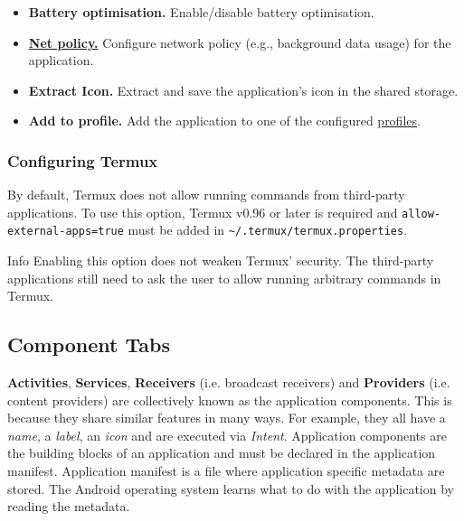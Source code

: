 \begin{itemize}
    \item \textbf{Battery optimisation.} Enable/disable battery optimisation.

    \item \hyperref[sec:net-policy]{\textbf{Net policy.}} Configure network policy (e.g., background data usage) for the
    application.

    \item \textbf{Extract Icon.} Extract and save the application's icon in the shared storage.

    \item \textbf{Add to profile.} Add the application to one of the configured \hyperref[sec:profile-page]{profiles}.
\end{itemize}

\subsubsection{Configuring Termux}\label{subsubsec:config-termux} %
By default, Termux does not allow running commands from third-party applications. To use this option, Termux v0.96 or
later is required and \texttt{allow-external-apps=true} must be added in \texttt{\textasciitilde/.termux/termux.properties}.

\begin{tip}{Info}
    Enabling this option does not weaken Termux' security. The third-party applications still need to ask the user to
    allow running arbitrary commands in Termux.
\end{tip}

\subsection{Component Tabs}\label{subsec:component-tabs} %
\textbf{Activities}, \textbf{Services}, \textbf{Receivers} (i.e. broadcast receivers) and \textbf{Providers}
(i.e. content providers) are collectively known as the application components. This is because they share
similar features in many ways. For example, they all have a \textit{name}, a \textit{label}, an \textit{icon} and are
executed via \textit{Intent}. Application components are the building blocks of an application and must be declared in
the application manifest. Application manifest is a file where application specific metadata are stored. The Android
operating system learns what to do with the application by reading the metadata.

